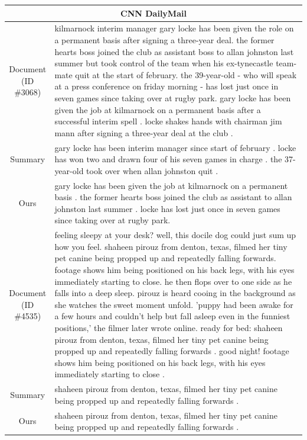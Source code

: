\begin{table}[bth!]
\begin{tabular}{c|p{}}
  \multicolumn{2}{c}{CNN DailyMail} \\ \hline
  \makecell{Document\\(ID \#3068)} & kilmarnock interim manager gary locke has been given the role on a permanent basis after signing a three-year deal. the former hearts boss joined the club as assistant boss to allan johnston last summer but took control of the team when his ex-tynecastle team-mate quit at the start of february. the 39-year-old - who will speak at a press conference on friday morning - has lost just once in seven games since taking over at rugby park. gary locke has been given the job at kilmarnock on a permanent basis after a successful interim spell . locke shakes hands with chairman jim mann after signing a three-year deal at the club . \\\hline
  Summary & gary locke has been interim manager since start of february . locke has won two and drawn four of his seven games in charge . the 37-year-old took over when allan johnston quit .\\\hline
  Ours & gary locke has been given the job at kilmarnock on a permanent basis . the former hearts boss joined the club as assistant to allan johnston last summer . locke has lost just once in seven games since taking over at rugby park. \\\hline
  \makecell{Document\\(ID \#4535)} & feeling sleepy at your desk? well, this docile dog could just sum up how you feel. shaheen pirouz from denton, texas, filmed her tiny pet canine being propped up and repeatedly falling forwards. footage shows him being positioned on his back legs, with his eyes immediately starting to close. he then flops over to one side as he falls into a deep sleep. pirouz is heard cooing in the background as she watches the sweet moment unfold. 'puppy had been awake for a few hours and couldn't help but fall asleep even in the funniest positions,' the filmer later wrote online. ready for bed: shaheen pirouz from denton, texas, filmed her tiny pet canine being propped up and repeatedly falling forwards . good night! footage shows him being positioned on his back legs, with his eyes immediately starting to close . \\\hline
  Summary & shaheen pirouz from denton, texas, filmed her tiny pet canine being propped up and repeatedly falling forwards . \\\hline
  Ours & shaheen pirouz from denton, texas, filmed her tiny pet canine being propped up and repeatedly falling forwards . \\\hline

\end{tabular}
\end{table}
